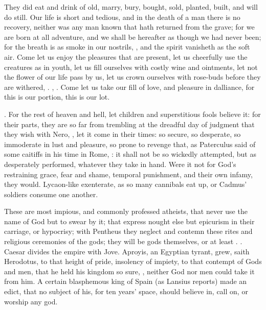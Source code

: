 {They did eat and drink of old, marry, bury, bought, sold,
planted, built, and will do still. Our life is short and tedious,
and in the death of a man there is no recovery, neither was any man
known that hath returned from the grave; for we are born at all
adventure, and we shall be hereafter as though we had never been; for
the breath is as smoke in our nostrils, \etc{}, and the spirit vanisheth
as the soft air. Come let us enjoy the pleasures that are
present, let us cheerfully use the creatures as in youth, let us fill
ourselves with costly wine and ointments, let not the flower of our
life pass by us, let us crown ourselves with rose-buds before they are
withered, \etc{}. , \etc{}.  Come let
us take our fill of love, and pleasure in dalliance, for this is our
portion, this is our lot.

. For the rest of
heaven and hell, let children and superstitious fools believe it: for
their parts, they are so far from trembling at the dreadful day of
judgment that they wish with Nero, , let it come in their
times: so secure, so desperate, so immoderate in lust and pleasure, so
prone to revenge that, as Paterculus said of some caitiffs in his time
in Rome, : it shall not be so
wickedly attempted, but as desperately performed, whatever they take in
hand. Were it not for God's restraining grace, fear and shame, temporal
punishment, and their own infamy, they would. Lycaon-like exenterate,
as so many cannibals eat up, or Cadmus' soldiers consume one another.

These are most impious, and commonly professed atheists, that never use
the name of God but to swear by it; that express nought else but
epicurism in their carriage, or hypocrisy; with Pentheus they neglect
and contemn these rites and religious ceremonies of the gods; they will
be gods themselves, or at least . . Caesar divides the empire with Jove. Aproyis, an Egyptian
tyrant, grew, saith Herodotus, to that height of pride, insolency
of impiety, to that contempt of Gods and men, that he held his kingdom
so sure, , neither God
nor men could take it from him. A certain blasphemous king of
Spain (as Lansius reports) made an edict, that no subject of his,
for ten years' space, should believe in, call on, or worship any god.

}
